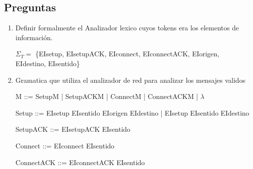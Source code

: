 \documentclass[12pt, twoside, openright]{report} %
\begin{document}

\subsection{Preguntas}

\begin{enumerate}
	\item Definir formalmente el Analizador lexico cuyos tokens era los elementos de información.

	      $\Sigma_T = $ \{EIsetup, EIsetupACK, EIconnect, EIconnectACK, EIorigen, EIdestino, EIsentido\}

	      
	\item Gramatica que utiliza el analizador de red para analizar los mensajes validos

	      M ::= SetupM | SetupACKM | ConnectM | ConnectACKM | $\lambda$

	      Setup ::= EIsetup EIsentido EIorigen EIdestino | EIsetup EIsentido EIdestino

	      SetupACK ::= EIsetupACK EIsentido

	      Connect ::= EIconnect EIsentido

	      ConnectACK ::= EIconnectACK EIsentido
\end{enumerate}
\end{document}
